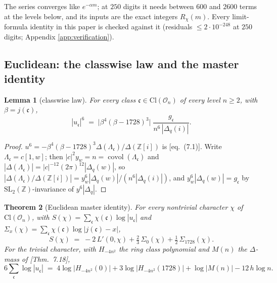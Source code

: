 \documentclass[11pt]{amsart}
\numberwithin{equation}{section}
\theoremstyle{plain}
\newtheorem{theorem}{Theorem}[section]
\newtheorem{lemma}[theorem]{Lemma}
\theoremstyle{definition}
\theoremstyle{remark}
\newcommand{\Z}{\mathbb{Z}}
\newcommand{\Zi}{\Z[i]}
\newcommand{\SL}{\mathrm{SL}}
\newcommand{\Cl}{\mathrm{Cl}}
\newcommand{\idealc}{\mathfrak{c}}
\newcommand{\covol}{\operatorname{covol}}
\newcommand{\lat}[1]{\left[#1\right]}
\newcommand{\Oc}{\mathcal{O}}
\newcommand{\PaperI}{\cite{SchmidtI}}
\begin{document}
The series converges like $e^{-\alpha m}$; at $250$ digits it needs
between $600$ and $2600$ terms at the levels below, and its inputs are
the exact integers $R_\chi(m)$.  Every limit-formula identity in this
paper is checked against it (residuals $\le 2\cdot 10^{-248}$ at $250$
digits; Appendix \ref{app:verification}).

\subsection{Euclidean: the classwise law and the master identity}
\label{subsec:euc-master}

\begin{lemma}[classwise law]\label{lem:euc-classwise}
For every class $\idealc \in \Cl(\Oc_n)$ of every level $n \ge 2$, with
$\beta = j(\idealc)$,
\[
  |u_\idealc|^{6} \;=\; \bigl|\beta^4(\beta - 1728)^3\bigr|\;
  \frac{g_\idealc}{n^{6}\,|\Delta_q(i)|} .
\]
\end{lemma}

\begin{proof}
$u^6 = -\beta^4(\beta - 1728)^3\Delta(\Lambda_\idealc)/\Delta(\Zi)$ is
\PaperI[eq.~(7.1)].  Write $\Lambda_\idealc = c\lat{1, w}$; then $|c|^2y_w
= n = \covol(\Lambda_\idealc)$ and $|\Delta(\Lambda_\idealc)| =
|c|^{-12}(2\pi)^{12}|\Delta_q(w)|$, so $|\Delta(\Lambda_\idealc)/
\Delta(\Zi)| = y_w^6|\Delta_q(w)|/(n^6|\Delta_q(i)|)$, and $y_w^6
|\Delta_q(w)| = g_\idealc$ by $\SL_2(\Z)$-invariance of $y^6|\Delta_q|$.
\end{proof}

\begin{theorem}[Euclidean master identity]\label{thm:euc-master}
For every nontrivial character $\chi$ of $\Cl(\Oc_n)$, with $S(\chi) =
\sum_\idealc\chi(\idealc)\log|u_\idealc|$ and $\Sigma_x(\chi) =
\sum_\idealc\chi(\idealc)\log|j(\idealc) - x|$,
\begin{equation}\label{eq:euc-master}
  \boxed{\;S(\chi) \;=\; -2\,L'(0,\chi) + \tfrac23\,\Sigma_0(\chi) +
  \tfrac12\,\Sigma_{1728}(\chi).\;}
\end{equation}
For the trivial character, with $H_{-4n^2}$ the ring class polynomial
and $M(n)$ the $\Delta$-mass of \PaperI[Thm.~7.18],
\begin{equation}\label{eq:euc-trivial}
  6\sum_\idealc\log|u_\idealc| \;=\; 4\log|H_{-4n^2}(0)| +
  3\log|H_{-4n^2}(1728)| + \log|M(n)| - 12\,h\log n .
\end{equation}
\end{theorem}
\end{document}
